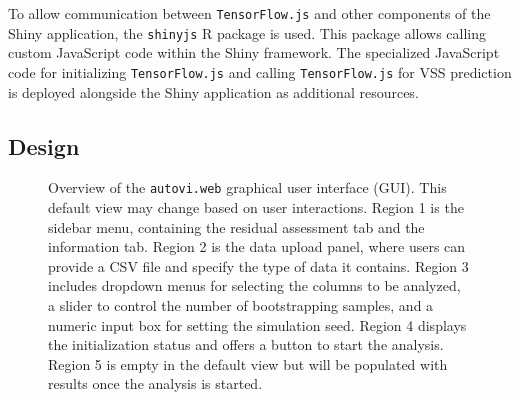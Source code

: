 \documentclass[
doublespace,
  times]{anzsauth}
\begin{document}
To allow communication between \texttt{TensorFlow.js} and other
components of the Shiny application, the \texttt{shinyjs} R package is
used. This package allows calling custom JavaScript code within the
Shiny framework. The specialized JavaScript code for initializing
\texttt{TensorFlow.js} and calling \texttt{TensorFlow.js} for VSS
prediction is deployed alongside the Shiny application as additional
resources.

\subsection{Design}\label{sec-autovi-web-design}

\begin{figure}


\caption{\label{fig-autovi-web}Overview of the \texttt{autovi.web}
graphical user interface (GUI). This default view may change based on
user interactions. Region 1 is the sidebar menu, containing the residual
assessment tab and the information tab. Region 2 is the data upload
panel, where users can provide a CSV file and specify the type of data
it contains. Region 3 includes dropdown menus for selecting the columns
to be analyzed, a slider to control the number of bootstrapping samples,
and a numeric input box for setting the simulation seed. Region 4
displays the initialization status and offers a button to start the
analysis. Region 5 is empty in the default view but will be populated
with results once the analysis is started.}

\end{figure}%
\end{document}

